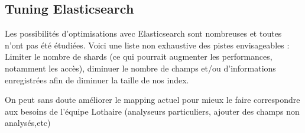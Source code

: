 \subsection{Tuning Elasticsearch}
Les possibilités d'optimisations avec Elasticsearch sont nombreuses et toutes n'ont pas été
étudiées. Voici une liste non exhaustive des pistes envisageables : Limiter le nombre de shards (ce qui pourrait
augmenter les performances, notamment les accès), diminuer le nombre de champs et/ou 
d'informations enregistrées afin de diminuer la taille de nos index.

On peut sans doute améliorer le mapping actuel pour mieux le faire correspondre aux
besoins de l'équipe Lothaire (analyseurs particuliers, ajouter des champs non analysés,etc)


%
